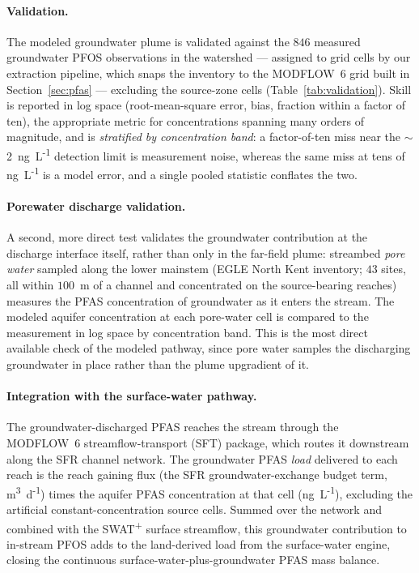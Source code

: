 \paragraph{Validation.} The modeled groundwater plume is validated against the $846$ measured
groundwater PFOS observations in the watershed --- assigned to grid cells by our extraction pipeline,
which snaps the inventory to the MODFLOW~6 grid built in Section~\ref{sec:pfas} --- excluding the
source-zone cells (Table~\ref{tab:validation}).
Skill is reported in log space (root-mean-square error, bias, fraction within a factor of ten), the
appropriate metric for concentrations spanning many orders of magnitude, and is \emph{stratified by
concentration band}: a factor-of-ten miss near the $\sim$2~ng~L\textsuperscript{-1} detection limit is
measurement noise, whereas the same miss at tens of ng~L\textsuperscript{-1} is a model error, and a
single pooled statistic conflates the two.

\paragraph{Porewater discharge validation.} A second, more direct test validates the groundwater
contribution at the discharge interface itself, rather than only in the far-field plume: streambed
\emph{pore water} sampled along the lower mainstem (EGLE North Kent inventory; $43$ sites, all within
$100$~m of a channel and concentrated on the source-bearing reaches) measures the PFAS concentration of
groundwater as it enters the stream. The modeled aquifer concentration at each pore-water cell is
compared to the measurement in log space by concentration band. This is the most direct available
check of the modeled pathway, since pore water samples the discharging groundwater in place rather than
the plume upgradient of it.

\paragraph{Integration with the surface-water pathway.} The groundwater-discharged PFAS reaches the
stream through the MODFLOW~6 streamflow-transport (SFT) package, which routes it downstream along the
SFR channel network. The groundwater PFAS \emph{load} delivered to each reach is the reach gaining
flux (the SFR groundwater-exchange budget term, m\textsuperscript{3}~d\textsuperscript{-1}) times the
aquifer PFAS concentration at that cell (ng~L\textsuperscript{-1}), excluding the artificial
constant-concentration source cells. Summed over the network and combined with the
SWAT\textsuperscript{+} surface streamflow, this groundwater contribution to in-stream PFOS adds to
the land-derived load from the surface-water engine, closing the continuous
surface-water-plus-groundwater PFAS mass balance.
